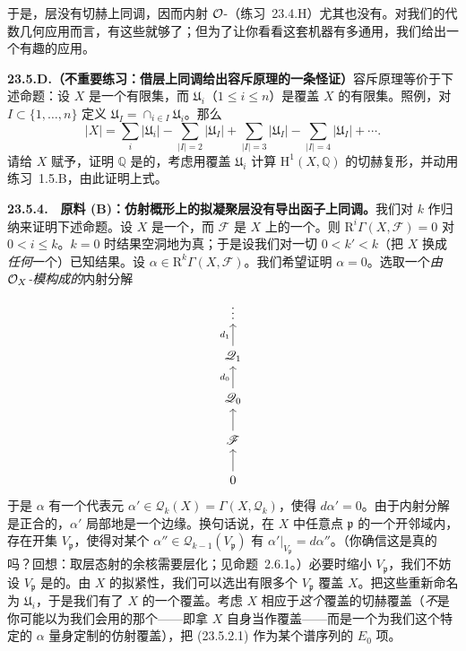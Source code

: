 于是，\trFlasque{}层没有切赫上同调，因而内射 $\mathcal{O}$-\trModule{}（\mbox{练习~23.4.H}）尤其也没有。对我们的代数几何应用而言，有这些就够了；但为了让你看看这套机器有多通用，我们给出一个有趣的应用。

\textbf{23.5.D.（不重要练习：借层上同调给出容斥原理的一条怪证）}\quad 容斥原理等价于下述命题：设 $X$ 是一个有限集，而 $\mathfrak{U}_i$（$1\le i\le n$）是覆盖 $X$ 的有限集。照例，对 $I\subset\{1,\dots,n\}$ 定义 $\mathfrak{U}_I=\cap_{i\in I}\mathfrak{U}_i$。那么
\[
|X|=\sum_i|\mathfrak{U}_i|-\sum_{|I|=2}|\mathfrak{U}_{I}|+\sum_{|I|=3}|\mathfrak{U}_{I}|-\sum_{|I|=4}|\mathfrak{U}_{I}|+\cdots.
\]
请给 $X$ 赋予\trDiscreteTopology，证明\trConstantSheaf{} $\mathbb{Q}$ 是\trFlasque{}的，考虑用覆盖 $\mathfrak{U}_i$ 计算 $\mathrm{H}^1(X,\mathbb{Q})$ 的切赫复形，并动用\mbox{练习~1.5.B}，由此证明上式。

\textbf{23.5.4.}\ \hard\ \textbf{原料 (B)：仿射概形上的拟凝聚层没有导出函子上同调。}\quad 我们对 $k$ 作归纳来证明下述命题。设 $X$ 是一个\trAffineScheme，而 $\mathscr{F}$ 是 $X$ 上的一个\trQCSheaf。则 $\mathrm{R}^i\Gamma(X,\mathscr{F})=0$ 对 $0<i\le k$。$k=0$ 时结果空洞地为真；于是设我们对一切 $0<k'<k$（把 $X$ 换成\emph{任何}一个\trAffineScheme）已知结果。设 $\alpha\in\mathrm{R}^k\Gamma(X,\mathscr{F})$。我们希望证明 $\alpha=0$。选取一个\emph{由 $\mathcal{O}_X$-模构成的}内射分解
\[
\begin{tikzcd}[row sep=1.8em]
 & \vdots & \\
 & \mathscr{Q}_1 \ar[u, "d_1"] & \\
 & \mathscr{Q}_0 \ar[u, "d_0"] & \\
 & \mathscr{F} \ar[u] & \\
 & 0 \ar[u] &
\end{tikzcd}
\]
于是 $\alpha$ 有一个代表元 $\alpha'\in\mathscr{Q}_k(X)=\Gamma(X,\mathscr{Q}_k)$，使得 $d\alpha'=0$。由于内射分解是正合的，$\alpha'$ 局部地是一个边缘。换句话说，在 $X$ 中任意点 $\mathfrak{p}$ 的一个开邻域内，存在开集 $V_\mathfrak{p}$，使得对某个 $\alpha''\in\mathscr{Q}_{k-1}(V_\mathfrak{p})$ 有 $\alpha'|_{V_\mathfrak{p}}=d\alpha''$。（你确信这是真的吗？回想：取层态射的余核需要层化；见\mbox{命题~2.6.1}。）必要时缩小 $V_\mathfrak{p}$，我们不妨设 $V_\mathfrak{p}$ 是\trAffine{}的。由 $X$ 的拟紧性，我们可以选出有限多个 $V_\mathfrak{p}$ 覆盖 $X$。把这些重新命名为 $\mathfrak{U}_i$，于是我们有了 $X$ 的一个\trAffine{}覆盖。考虑 $X$ 相应于\emph{这个}\trAffine{}覆盖的切赫覆盖（\emph{不}是你可能以为我们会用的那个——即拿 $X$ 自身当作覆盖——而是一个为我们这个特定的 $\alpha$ 量身定制的仿射覆盖），把\trDoubleComplex{} (23.5.2.1) 作为某个谱序列的 $E_0$ 项。

